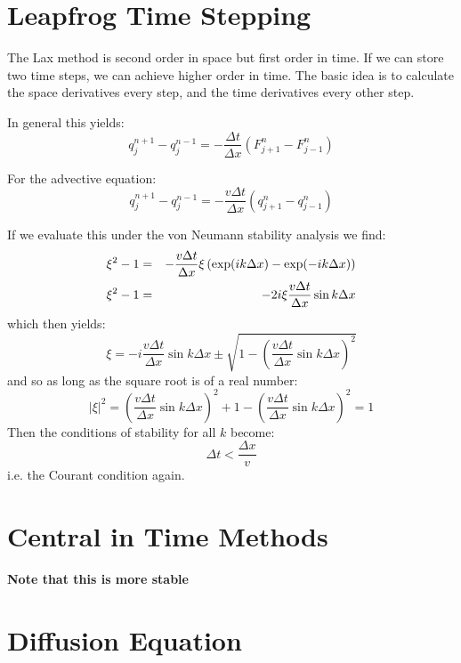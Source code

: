 \section{Leapfrog Time Stepping}

The Lax method is second order in space but first order in time. If we
can store two time steps, we can achieve higher order in time. The
basic idea is to calculate the space derivatives every step, and the
time derivatives every other step. 

In general this yields:
\begin{equation}
q_j^{n+1} - q_j^{n-1} = - \frac{\Delta t}{\Delta x} \left(F_{j+1}^n -
F_{j-1}^n\right)
\end{equation}

For the advective equation:
\begin{equation}
q_j^{n+1} - q_j^{n-1} = - \frac{ v \Delta t}{\Delta x} \left(q_{j+1}^n
- q_{j-1}^n\right)
\end{equation}

If we evaluate this under the von Neumann stability analysis we find:
\begin{eqnarray}
\xi^2 - 1 &=& - \frac{v \Delta t}{\Delta x} \xi \left(\exp(i k \Delta x)
- \exp(- i k \Delta x) \right) \cr
\xi^2 - 1 &=& - 2i \xi \frac{v \Delta t}{\Delta x} \sin k\Delta x 
\end{eqnarray}
which then yields:
\begin{equation}
\xi = - i \frac{v \Delta t}{\Delta x} \sin k\Delta x \pm
\sqrt{1 - \left(\frac{v \Delta t}{\Delta x} \sin k\Delta x \right)^2}
\end{equation}
and so as long as the square root is of a real number:
\begin{equation}
|\xi|^2 = \left(\frac{v \Delta t}{\Delta x} \sin k\Delta x \right)^2 +
 1 - \left(\frac{v \Delta t}{\Delta x} \sin k\Delta x \right)^2 = 1
\end{equation}
Then the conditions of stability for all $k$ become:
\begin{equation}
\Delta t < \frac{\Delta x}{v}
\end{equation}
i.e. the Courant condition again.

\section{Central in Time Methods}

{\bf Note that this is more stable}

\section{Diffusion Equation}

